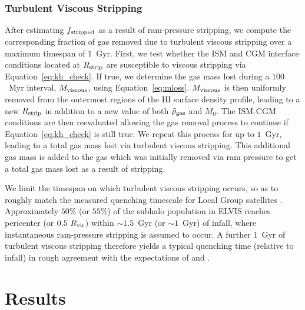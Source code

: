 \documentclass[usenatbib]{mn2e}
\begin{document}
\subsubsection{Turbulent Viscous Stripping}
%
After estimating $f_{\rm stripped}$ as a result of ram-pressure
stripping, we compute the corresponding fraction of gas removed due to
turbulent viscous stripping over a maximum timespan of $1$~Gyr.
%
First, we test whether the ISM and CGM interface conditions located at
$R_{\rm strip} $ are susceptible to viscous stripping via
Equation~\ref{eq:kh_check}.
%
If true, we determine the gas mass lost during a $100$~Myr
interval, $M_{\rm viscous}$, using Equation~\ref{eq:mloss}.
$M_{\rm viscous}$ is then uniformly removed from the outermost regions of
the H{\scriptsize I} surface density profile, leading to a new $R_{\rm
  strip} $ in addition to a new value of both $\bar{\rho}_{\rm
  gas}$ and $M_{0}$.
The ISM-CGM conditions are then reevaluated allowing the gas removal
process to continue if Equation~\ref{eq:kh_check} is still true. 
We repeat this process for up to $1$~Gyr, leading to a total gas mass
lost via turbulent viscous stripping. 
This additional gas mass is added to the gas which was initially
removed via ram pressure to get a total gas mass lost as a result of
stripping.
%

We limit the timespan on which turbulent viscous stripping occurs, so
as to roughly match the measured quenching timescale for Local Group
satellites \citep[i.e.~$\lesssim 2$~Gyr,][]{fham15}.
%
Approximately $50\%$ (or $55\%$) of the subhalo population in ELVIS
reaches pericenter (or $0.5~R_{\rm vir}$) within $\sim1.5$~Gyr (or
$\sim1$~Gyr) of infall, where instantaneous ram-pressure stripping is
assumed to occur.
%
A further $1$~Gyr of turbulent viscous stripping therefore yields a
typical quenching time (relative to infall) in rough agreement with
the expectations of \citet{fham15} and \citet{wetzel15b}.





\section{Results}
\label{sec:results}
\end{document}
